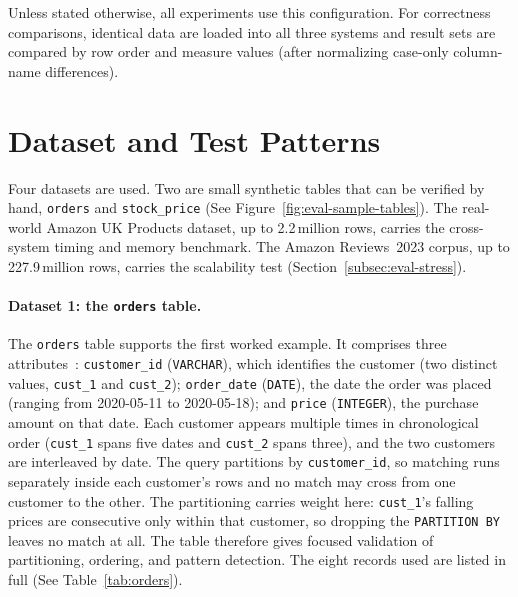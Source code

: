Unless stated otherwise, all experiments use this configuration.
For correctness comparisons, identical data are loaded into all three
systems and result sets are compared by row order and measure values
(after normalizing case-only column-name differences).

\section{Dataset and Test Patterns}
\label{sec:eval-dataset}

\label{subsec:eval-dataset-orders}

Four datasets are used.  Two are small synthetic tables that can be
verified by hand, \texttt{orders} and \texttt{stock\_price}
(See Figure~\ref{fig:eval-sample-tables}).  The
real-world Amazon UK Products dataset, up to 2.2\,million rows, carries
the cross-system timing and memory benchmark.  The Amazon Reviews~2023
corpus, up to 227.9\,million rows, carries the scalability test
(Section~\ref{subsec:eval-stress}).

\paragraph{Dataset 1: the \texttt{orders} table.}
The \texttt{orders} table supports the first worked example.  It
comprises three attributes~\cite{trino2021row}: \texttt{customer\_id}
(\texttt{VARCHAR}), which identifies the customer (two distinct
values, \texttt{cust\_1} and \texttt{cust\_2}); \texttt{order\_date}
(\texttt{DATE}), the date the order was placed (ranging from
2020-05-11 to 2020-05-18); and \texttt{price} (\texttt{INTEGER}), the
purchase amount on that date.  Each customer appears multiple times in
chronological order (\texttt{cust\_1} spans five dates and
\texttt{cust\_2} spans three), and the two customers are interleaved
by date.  The query partitions by \texttt{customer\_id}, so matching
runs separately inside each customer's rows and no match may cross
from one customer to the other.  The partitioning carries weight here:
\texttt{cust\_1}'s falling prices are consecutive only within that
customer, so dropping the \texttt{PARTITION BY} leaves no match at
all.  The table therefore gives focused validation of partitioning,
ordering, and pattern detection.  The eight records used are listed in
full (See Table~\ref{tab:orders}).

